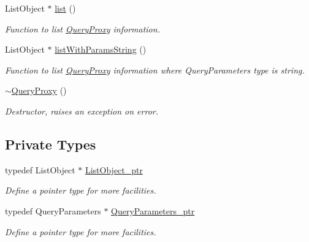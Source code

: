 \begin{DoxyCompactItemize}
ListObject $\ast$ \hyperlink{classQueryProxy_a23e516962073ad50a0375ff3c38cb77a}{list} ()
\begin{DoxyCompactList}\small\item\em Function to list \hyperlink{classQueryProxy}{QueryProxy} information. \item\end{DoxyCompactList}\item 
ListObject $\ast$ \hyperlink{classQueryProxy_ab6debbf7fbc67c4928c16b4ed4d94be8}{listWithParamsString} ()
\begin{DoxyCompactList}\small\item\em Function to list \hyperlink{classQueryProxy}{QueryProxy} information where QueryParameters type is string. \item\end{DoxyCompactList}\item 
\hyperlink{classQueryProxy_a318cd724c4bf2f2cc3103f9dc788bd7b}{$\sim$QueryProxy} ()
\begin{DoxyCompactList}\small\item\em Destructor, raises an exception on error. \item\end{DoxyCompactList}\end{DoxyCompactItemize}
\subsection*{Private Types}
\begin{DoxyCompactItemize}
\item 
\hypertarget{classQueryProxy_a2ed29ef6f2e7de15a59c3fc9e48dcd76}{
typedef ListObject $\ast$ \hyperlink{classQueryProxy_a2ed29ef6f2e7de15a59c3fc9e48dcd76}{ListObject\_\-ptr}}
\label{classQueryProxy_a2ed29ef6f2e7de15a59c3fc9e48dcd76}

\begin{DoxyCompactList}\small\item\em Define a pointer type for more facilities. \item\end{DoxyCompactList}\item 
\hypertarget{classQueryProxy_a92bffb52502dff5376c6f5760920866b}{
typedef QueryParameters $\ast$ \hyperlink{classQueryProxy_a92bffb52502dff5376c6f5760920866b}{QueryParameters\_\-ptr}}
\label{classQueryProxy_a92bffb52502dff5376c6f5760920866b}

\begin{DoxyCompactList}\small\item\em Define a pointer type for more facilities. \item\end{DoxyCompactList}\end{DoxyCompactItemize}
